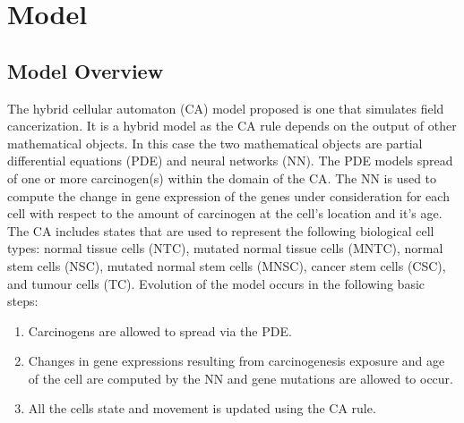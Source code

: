 \documentclass[\main/thesis.tex]{subfiles}
\begin{document}
\chapter{Model}

\section{Model Overview}

The hybrid cellular automaton (CA) model proposed is one that simulates field 
cancerization. It is a hybrid model as the CA rule depends on the output of 
other mathematical objects. In this case the two mathematical objects are 
partial differential equations (PDE) and neural networks (NN). The PDE models 
spread of one or more carcinogen(s) within the domain of the CA. The NN is used 
to compute the change in gene expression of the genes under consideration for 
each cell with respect to the amount of carcinogen at the cell's location and 
it's age. The CA includes states that are used to represent the following 
biological cell types: normal tissue cells (NTC), mutated normal tissue cells 
(MNTC), normal stem cells (NSC), mutated normal stem cells (MNSC), cancer stem 
cells (CSC), and tumour cells (TC). Evolution of the model occurs in the 
following basic steps:
\begin{enumerate}
	\item Carcinogens are allowed to spread via the PDE.
	\item Changes in gene expressions resulting from carcinogenesis exposure and 
	      age of the cell are computed by the NN and gene mutations are allowed 
	      to occur. 
	\item All the cells state and movement is updated using the CA rule. 
\end{enumerate}
\end{document}
